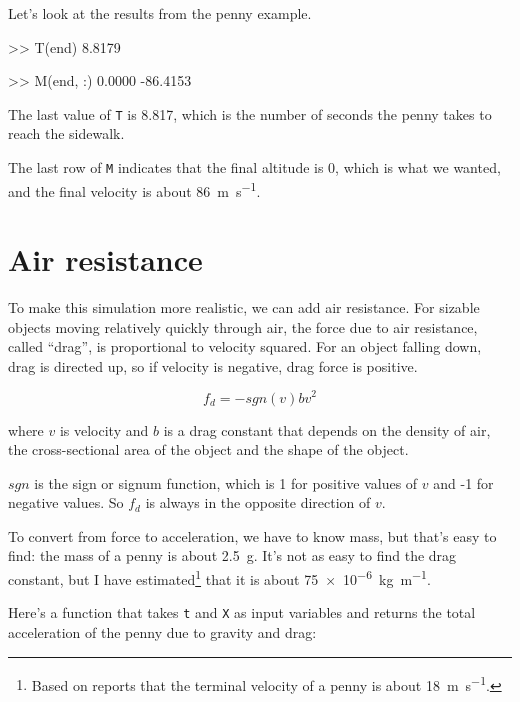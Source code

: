 \documentclass[
]{book}
\numberwithin{Answer}{chapter}
\numberwithin{Exercise}{chapter}
\begin{document}
Let's look at the results from the penny example.  

\begin{code}
>> T(end)
8.8179

>> M(end, :)
0.0000  -86.4153
\end{code}

The last value of {\tt T} is 8.817, which is the number of seconds the penny takes to reach the sidewalk.

The last row of {\tt M} indicates that the final altitude is 0, which is what we wanted, and the final velocity is about \SI{86}{\meter \per \second}.


\section{Air resistance}
\label{sect:air_resistance}


To make this simulation more realistic, we can add air resistance.
For sizable objects moving relatively quickly through air, the force due to air resistance, called ``drag'', is proportional to velocity squared.  
For an object falling down, drag is
directed up, so if velocity is negative, drag force is positive.

\begin{equation}\label{eq:simpledrag}
    f_{d} = -sgn(v) b v^2 
\end{equation}

where $v$ is velocity and
$b$ is a drag constant that depends on the density of
air, the cross-sectional area of the object and the shape
of the object.  


$sgn$ is the sign or signum function, which is 1 for positive values of 
$v$ and -1 for negative values.  So $f_d$ is always in the opposite direction of $v$.


To convert from force to acceleration, we have to know mass, but that's easy to find: the mass of a penny is about \SI{2.5}{\gram}.  It's not as easy to find the drag constant, but I have estimated\footnote{Based on reports that the terminal velocity of a penny is about \SI{18}{\meter \per \second}.} that it is about \SI{75e-6}{\kilogram \per \meter}.

Here's a function that takes {\tt t} and {\tt X} as input variables and returns the total acceleration of the penny due to gravity and drag:
\end{document}
